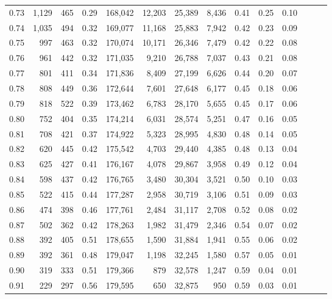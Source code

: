 \begin{tabular}{rrrrrrrrrrrrrr}
0.73 &  1,129 &  465 &  0.29 &  168,042 &   12,203 &  25,389 &   8,436 &  0.41 &  0.25 &      0.10 \\
0.74 &  1,035 &  494 &  0.32 &  169,077 &   11,168 &  25,883 &   7,942 &  0.42 &  0.23 &      0.09 \\
0.75 &    997 &  463 &  0.32 &  170,074 &   10,171 &  26,346 &   7,479 &  0.42 &  0.22 &      0.08 \\
0.76 &    961 &  442 &  0.32 &  171,035 &    9,210 &  26,788 &   7,037 &  0.43 &  0.21 &      0.08 \\
0.77 &    801 &  411 &  0.34 &  171,836 &    8,409 &  27,199 &   6,626 &  0.44 &  0.20 &      0.07 \\
0.78 &    808 &  449 &  0.36 &  172,644 &    7,601 &  27,648 &   6,177 &  0.45 &  0.18 &      0.06 \\
0.79 &    818 &  522 &  0.39 &  173,462 &    6,783 &  28,170 &   5,655 &  0.45 &  0.17 &      0.06 \\
0.80 &    752 &  404 &  0.35 &  174,214 &    6,031 &  28,574 &   5,251 &  0.47 &  0.16 &      0.05 \\
0.81 &    708 &  421 &  0.37 &  174,922 &    5,323 &  28,995 &   4,830 &  0.48 &  0.14 &      0.05 \\
0.82 &    620 &  445 &  0.42 &  175,542 &    4,703 &  29,440 &   4,385 &  0.48 &  0.13 &      0.04 \\
0.83 &    625 &  427 &  0.41 &  176,167 &    4,078 &  29,867 &   3,958 &  0.49 &  0.12 &      0.04 \\
0.84 &    598 &  437 &  0.42 &  176,765 &    3,480 &  30,304 &   3,521 &  0.50 &  0.10 &      0.03 \\
0.85 &    522 &  415 &  0.44 &  177,287 &    2,958 &  30,719 &   3,106 &  0.51 &  0.09 &      0.03 \\
0.86 &    474 &  398 &  0.46 &  177,761 &    2,484 &  31,117 &   2,708 &  0.52 &  0.08 &      0.02 \\
0.87 &    502 &  362 &  0.42 &  178,263 &    1,982 &  31,479 &   2,346 &  0.54 &  0.07 &      0.02 \\
0.88 &    392 &  405 &  0.51 &  178,655 &    1,590 &  31,884 &   1,941 &  0.55 &  0.06 &      0.02 \\
0.89 &    392 &  361 &  0.48 &  179,047 &    1,198 &  32,245 &   1,580 &  0.57 &  0.05 &      0.01 \\
0.90 &    319 &  333 &  0.51 &  179,366 &      879 &  32,578 &   1,247 &  0.59 &  0.04 &      0.01 \\
0.91 &    229 &  297 &  0.56 &  179,595 &      650 &  32,875 &     950 &  0.59 &  0.03 &      0.01 \\

\end{tabular}
